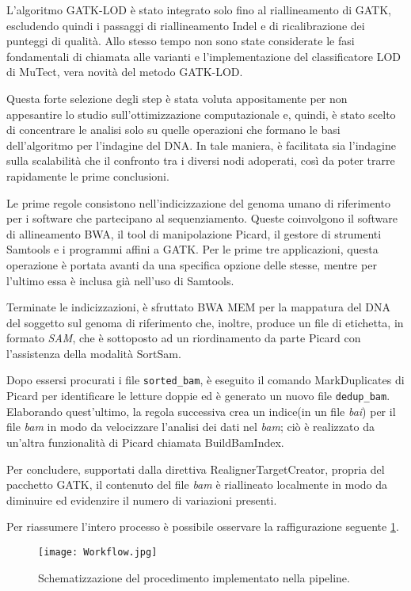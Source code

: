 L'algoritmo GATK-LOD è stato integrato solo fino al riallineamento di GATK, escludendo quindi i passaggi di riallineamento Indel e di ricalibrazione dei punteggi di qualità.
Allo stesso tempo non sono state considerate le fasi fondamentali di chiamata alle varianti e l'implementazione del classificatore LOD di MuTect, vera novità del metodo GATK-LOD.

Questa forte selezione degli step è stata voluta appositamente per non appesantire lo studio sull'ottimizzazione computazionale e, quindi, è stato scelto di concentrare le analisi solo su quelle operazioni che formano le basi dell'algoritmo per l'indagine del DNA.
In tale maniera, è facilitata sia l'indagine sulla scalabilità che il confronto tra i diversi nodi adoperati, così da poter trarre rapidamente le prime conclusioni.

Le prime regole consistono nell'indicizzazione del genoma umano di riferimento per i software che partecipano al sequenziamento.
Queste coinvolgono il software di allineamento BWA, il tool di manipolazione Picard, il gestore di strumenti Samtools e i programmi affini a GATK.
Per le prime tre  applicazioni, questa operazione è portata avanti da una specifica opzione delle stesse, mentre per l'ultimo essa è inclusa già nell'uso di Samtools.

Terminate le indicizzazioni, è sfruttato BWA MEM per la mappatura del DNA del soggetto sul genoma di riferimento che, inoltre, produce un file di etichetta, in formato \textit{SAM}, che è sottoposto ad un riordinamento da parte Picard con l'assistenza della modalità SortSam.

Dopo essersi procurati i file \verb!sorted_bam!, è eseguito il comando MarkDuplicates di Picard per identificare le letture doppie ed è generato un nuovo file \verb!dedup_bam!.
Elaborando quest'ultimo, la regola successiva crea un indice(in un file \textit{bai}) per il file \textit{bam} in modo da velocizzare l'analisi dei dati nel \textit{bam}; ciò è realizzato da un'altra funzionalità di Picard chiamata BuildBamIndex.

Per concludere, supportati dalla direttiva RealignerTargetCreator, propria del pacchetto GATK, il contenuto del file \textit{bam} è riallineato localmente in modo da diminuire ed evidenzire il numero di variazioni presenti.

Per riassumere l'intero processo è possibile osservare la raffigurazione seguente \ref{fig:w}.
\begin{figure}[H]
\centering
\texttt{[image: Workflow.jpg]}
\caption{Schematizzazione del procedimento implementato nella pipeline.}
\label{fig:w}
\end{figure}




